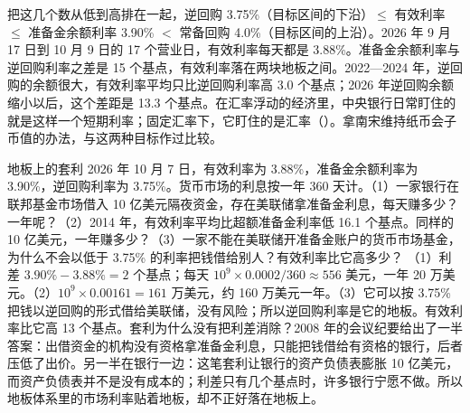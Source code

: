 把这几个数从低到高排在一起，逆回购 3.75\%（目标区间的下沿）$\le$ 有效利率 $\le$ 准备金余额利率 3.90\% $<$ 常备回购 4.0\%（目标区间的上沿）。2026 年 9 月 17 日到 10 月 9 日的 17 个营业日，有效利率每天都是 3.88\%\cite{fred2026m}。准备金余额利率与逆回购利率之差是 15 个基点，有效利率落在两块地板之间。2022—2024 年，逆回购的余额很大，有效利率平均只比逆回购利率高 3.0 个基点；2026 年逆回购余额缩小以后，这个差距是 13.3 个基点\cite{fred2026m}。在汇率浮动的经济里，中央银行日常盯住的就是这样一个短期利率；固定汇率下，它盯住的是汇率（）。拿南宋维持纸币会子币值的办法，与这两种目标作过比较。


\begin{example}{地板上的套利}\label{ex:money-floor}
2026 年 10 月 7 日，有效利率为 3.88\%，准备金余额利率为 3.90\%，逆回购利率为 3.75\%。货币市场的利息按一年 360 天计。（1）一家银行在联邦基金市场借入 10 亿美元隔夜资金，存在美联储拿准备金利息，每天赚多少？一年呢？（2）2014 年，有效利率平均比超额准备金利率低 16.1 个基点。同样的 10 亿美元，一年赚多少？（3）一家不能在美联储开准备金账户的货币市场基金，为什么不会以低于 3.75\% 的利率把钱借给别人？有效利率比它高多少？
\solution （1）利差 $3.90\%-3.88\%=2$ 个基点；每天 $10^9\times0.0002/360\approx556$ 美元，一年 20 万美元。（2）$10^9\times0.00161=161$ 万美元，约 160 万美元一年。（3）它可以按 3.75\% 把钱以逆回购的形式借给美联储，没有风险；所以逆回购利率是它的地板。有效利率比它高 13 个基点。套利为什么没有把利差消除？2008 年的会议纪要给出了一半答案：出借资金的机构没有资格拿准备金利息，只能把钱借给有资格的银行，后者压低了出价\cite{fomc2008min}。另一半在银行一边：这笔套利让银行的资产负债表膨胀 10 亿美元，而资产负债表并不是没有成本的；利差只有几个基点时，许多银行宁愿不做。所以地板体系里的市场利率贴着地板，却不正好落在地板上。
\end{example}

